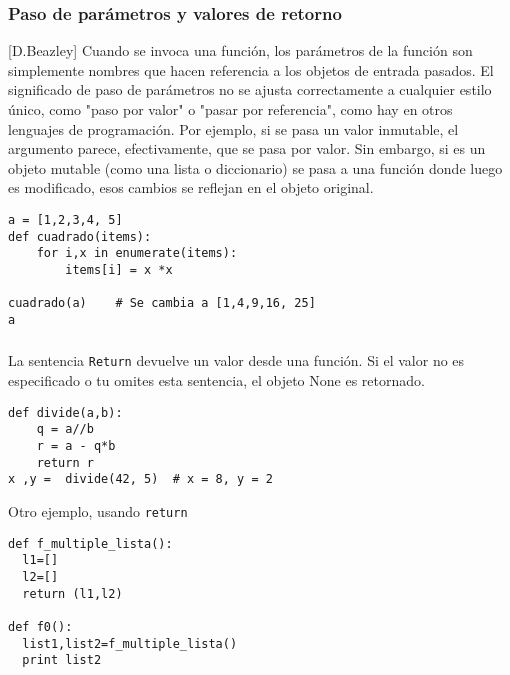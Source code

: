 \documentclass[10pt]{beamer}
\begin{document}
\begin{frame}[fragile]
\frametitle{Paso de par\'ametros y valores de retorno}
[D.Beazley] Cuando se invoca una funci\'on, los par\'ametros de la funci\'on son simplemente nombres que hacen referencia a los objetos de entrada pasados. El significado de paso de par\'ametros no se ajusta correctamente a cualquier estilo \'unico, como "paso por valor" o "pasar por referencia", como hay en otros lenguajes de programaci\'on. Por ejemplo, si se pasa un valor inmutable, el argumento parece, efectivamente, que  se pasa por valor. Sin embargo, si es un objeto mutable (como una lista o diccionario) se pasa a una funci\'on donde luego es modificado, esos cambios se reflejan en el objeto original.

\vspace{0.2cm}

\begin{lstlisting}
a = [1,2,3,4, 5]
def cuadrado(items):
    for i,x in enumerate(items):
        items[i] = x *x

cuadrado(a)    # Se cambia a [1,4,9,16, 25]
a
\end{lstlisting}

\end{frame}
\begin{frame}[fragile]
\frametitle{}
La sentencia \texttt{Return} devuelve un valor desde una funci\'on. Si el valor no es especificado o tu omites esta sentencia, el objeto None es retornado.

\vspace{0.2cm}

\begin{lstlisting}
def divide(a,b):
    q = a//b
    r = a - q*b
    return r
x ,y =  divide(42, 5)  # x = 8, y = 2
\end{lstlisting}

\vspace{0.2cm}

Otro ejemplo, usando \texttt{return}

\vspace{0.2cm}

\begin{lstlisting}
def f_multiple_lista():
  l1=[]
  l2=[]
  return (l1,l2)
  
def f0():
  list1,list2=f_multiple_lista()
  print list2
\end{lstlisting}
\end{frame}
\end{document}
